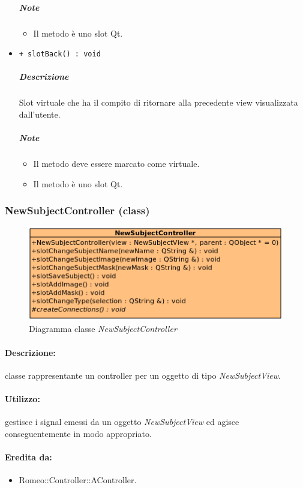 \begin{itemize}
			\subparagraph{Note}
			\begin{itemize}
				\item Il metodo è uno slot\g{} Qt\g{}.
			\end{itemize}
			\item \color{blue} \verb!+ slotBack() : void!
			\color{black}
			\subparagraph{Descrizione} Slot\g{}  virtuale che ha il compito di ritornare alla precedente view visualizzata dall'utente.
			\subparagraph{Note}
			\begin{itemize}
				\item Il metodo deve essere marcato come virtuale.
				\item Il metodo è uno slot\g{} Qt\g{}.
			\end{itemize}
		\end{itemize}
	\subsubsection{NewSubjectController (class)}
	\begin{figure}[!h]
		\centering
		\includegraphics[scale=2.75]{./Content/Immagini/controller/NewSubjectController.png}
		\caption{Diagramma classe \textsl{NewSubjectController}}
	\end{figure}
	\paragraph{Descrizione:} classe rappresentante un controller per un oggetto di tipo \textsl{NewSubjectView}.
	\paragraph{Utilizzo:} gestisce i signal\g{} emessi da un oggetto \textsl{NewSubjectView} ed agisce conseguentemente in modo appropriato.
	\paragraph{Eredita da:}
		\begin{itemize}
			\item Romeo::Controller::AController.
		\end{itemize}
